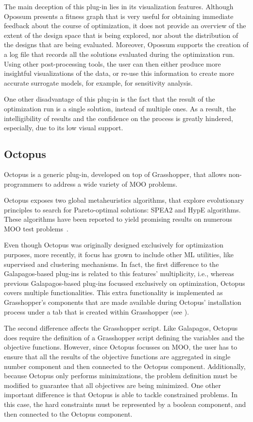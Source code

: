 	The main deception of this plug-in lies in its visualization features. Although Opossum presents a fitness graph that is very useful for obtaining immediate feedback about the course of optimization, it does not provide an overview of the extent of the design space that is being explored, nor about the distribution of the designs that are being evaluated. Moreover, Opossum supports the creation of a log file that records all the solutions evaluated during the optimization run. Using other post-processing tools, the user can then either produce more insightful visualizations of the data, or re-use this information to create more accurate surrogate models, for example, for sensitivity analysis.
	
	One other disadvantage of this plug-in is the fact that the result of the optimization run is a single solution, instead of multiple ones. As a result, the intelligibility of results and the confidence on the process is greatly hindered, especially, due to its low visual support. 
	
	\subsection{Octopus}
	
	Octopus \cite{OCTOPUS} is a generic plug-in, developed on top of Grasshopper, that allows non-programmers to address a wide variety of \ac{MOO} problems. 
	
	Octopus exposes two global metaheuristics algorithms, that explore evolutionary principles to search for Pareto-optimal solutions: \ac{SPEA2} and \ac{HypE} algorithms. These algorithms have been reported to yield promising results on numerous \ac{MOO} test problems~\cite{Zitzler2001SPEA2,Zitzler2011HypE}. 
	
	Even though Octopus was originally designed exclusively for optimization purposes, more recently, it focus has grown to include other \ac{ML} utilities, like supervised and clustering mechanisms. In fact, the first difference to the Galapagos-based plug-ins is related to this features' multiplicity, i.e., whereas previous Galapagos-based plug-ins focussed exclusively on optimization, Octopus covers multiple functionalities. This extra functionality is implemented as Grasshopper's components that are made available during Octopus' installation process under a tab that is created within Grasshopper (see ).
	
	The second difference affects the Grasshopper script. Like Galapagos, Octopus does require the definition of a Grasshopper script defining the variables and the objective functions. However, since Octopus focusses on \ac{MOO}, the user has to ensure that all the results of the objective functions are aggregated in single number component and then connected to the Octopus component. Additionally, because Octopus only performs minimizations, the problem definition must be modified to guarantee that all objectives are being minimized. One other important difference is that Octopus is able to tackle constrained problems. In this case, the hard constraints must be represented by a boolean component, and then connected to the Octopus component.
	
